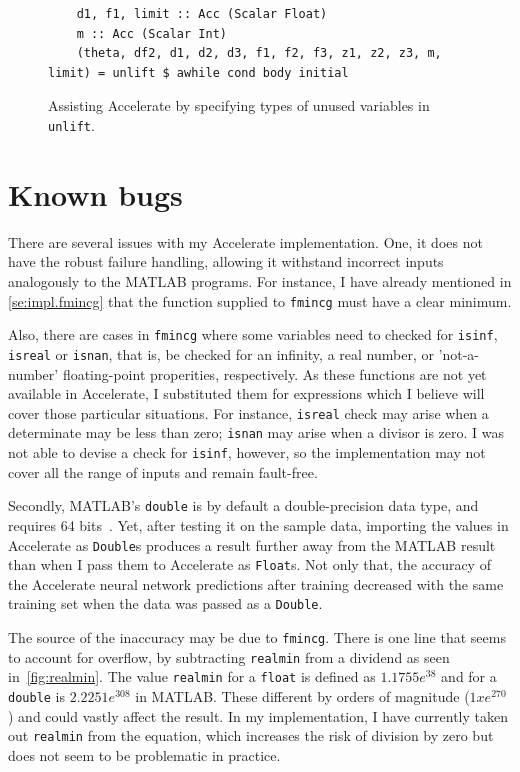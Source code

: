 \begin{figure}
	\begin{lstlisting}
    d1, f1, limit :: Acc (Scalar Float)
    m :: Acc (Scalar Int)
    (theta, df2, d1, d2, d3, f1, f2, f3, z1, z2, z3, m, limit) = unlift $ awhile cond body initial
	\end{lstlisting}
  	\caption{Assisting Accelerate by specifying types of unused variables in \texttt{unlift}.}
	\label{fig:unlift}
\end{figure}

\section{Known bugs} \label{se:impl.limits}

There are several issues with my Accelerate implementation. One, it does not have the robust failure handling, allowing it withstand incorrect inputs analogously to the MATLAB programs. For instance, I have already mentioned in \ref{se:impl.fmincg} that the function supplied to \texttt{fmincg} must have a clear minimum. 

Also, there are cases in \texttt{fmincg} where some variables need to checked for \texttt{isinf}, \texttt{isreal} or \texttt{isnan}, that is, be checked for an infinity, a real number, or 'not-a-number' floating-point properities, respectively. As these functions are not yet available in Accelerate, I substituted them for expressions which I believe will cover those particular situations. For instance, \texttt{isreal} check may arise when a determinate may be less than zero; \texttt{isnan} may arise when a divisor is zero. I was not able to devise a check for \texttt{isinf}, however, so the implementation may not cover all the range of inputs and remain fault-free.

Secondly, MATLAB's \texttt{double} is by default a double-precision data type, and requires 64 bits~\cite{Mat17}. Yet, after testing it on the sample data, importing the values in Accelerate as \texttt{Double}s produces a result further away from the MATLAB result than when I pass them to Accelerate as \texttt{Float}s. Not only that, the accuracy of the Accelerate neural network predictions after training decreased with the same training set when the data was passed as a \texttt{Double}. 

The source of the inaccuracy may be due to \texttt{fmincg}. There is one line that seems to account for overflow, by subtracting \texttt{realmin} from a dividend as seen in~\ref{fig:realmin}. The value \texttt{realmin} for a \texttt{float} is defined as $1.1755e^{38}$ and for a \texttt{double} is $2.2251e^{308}$ in MATLAB. These different by orders of magnitude ($1xe^{270}$) and could vastly affect the result. In my implementation, I have currently taken out \texttt{realmin} from the equation, which increases the risk of division by zero but does not seem to be problematic in practice.

